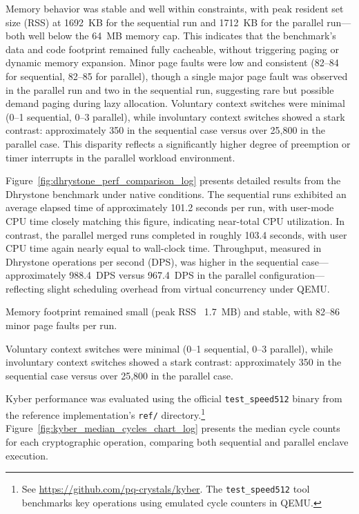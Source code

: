 Memory behavior was stable and well within constraints, with peak resident set size (RSS) at 1692~KB for the sequential run and 1712~KB for the parallel run—both well below the 64~MB memory cap. This indicates that the benchmark’s data and code footprint remained fully cacheable, without triggering paging or dynamic memory expansion. Minor page faults were low and consistent (82--84 for sequential, 82--85 for parallel), though a single major page fault was observed in the parallel run and two in the sequential run, suggesting rare but possible demand paging during lazy allocation. Voluntary context switches were minimal (0--1 sequential, 0--3 parallel), while involuntary context switches showed a stark contrast: approximately 350 in the sequential case versus over 25,800 in the parallel case. This disparity reflects a significantly higher degree of preemption or timer interrupts in the parallel workload environment.

Figure~\ref{fig:dhrystone_perf_comparison_log} presents detailed results from the Dhrystone benchmark under native conditions. The sequential runs exhibited an average elapsed time of approximately 101.2 seconds per run, with user-mode CPU time closely matching this figure, indicating near-total CPU utilization. In contrast, the parallel merged runs completed in roughly 103.4 seconds, with user CPU time again nearly equal to wall-clock time. Throughput, measured in Dhrystone operations per second (DPS), was higher in the sequential case—approximately 988.4~DPS versus 967.4~DPS in the parallel configuration—reflecting slight scheduling overhead from virtual concurrency under QEMU.

Memory footprint remained small (peak RSS ~1.7~MB) and stable, with 82--86 minor page faults per run.

Voluntary context switches were minimal (0--1 sequential, 0--3 parallel), while involuntary context switches showed a stark contrast: approximately 350 in the sequential case versus over 25,800 in the parallel case.

Kyber performance was evaluated using the official \texttt{test\_speed512} binary from the reference implementation's \texttt{ref/} directory.\footnote{See \url{https://github.com/pq-crystals/kyber}. The \texttt{test\_speed512} tool benchmarks key operations using emulated cycle counters in QEMU.} Figure~\ref{fig:kyber_median_cycles_chart_log} presents the median cycle counts for each cryptographic operation, comparing both sequential and parallel enclave execution.


